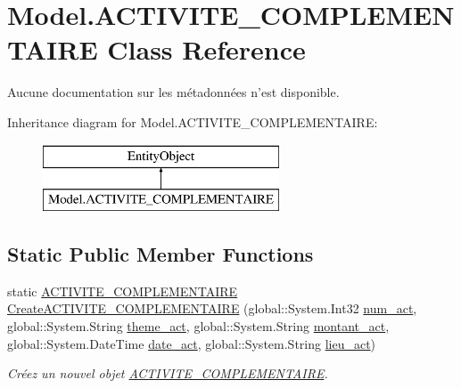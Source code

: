 \hypertarget{class_model_1_1_a_c_t_i_v_i_t_e___c_o_m_p_l_e_m_e_n_t_a_i_r_e}{\section{Model.\-A\-C\-T\-I\-V\-I\-T\-E\-\_\-\-C\-O\-M\-P\-L\-E\-M\-E\-N\-T\-A\-I\-R\-E Class Reference}
\label{class_model_1_1_a_c_t_i_v_i_t_e___c_o_m_p_l_e_m_e_n_t_a_i_r_e}
}


Aucune documentation sur les métadonnées n'est disponible.  


Inheritance diagram for Model.\-A\-C\-T\-I\-V\-I\-T\-E\-\_\-\-C\-O\-M\-P\-L\-E\-M\-E\-N\-T\-A\-I\-R\-E\-:\begin{figure}[H]
\begin{center}
\leavevmode
\includegraphics[height=2.000000cm]{class_model_1_1_a_c_t_i_v_i_t_e___c_o_m_p_l_e_m_e_n_t_a_i_r_e}
\end{center}
\end{figure}
\subsection*{Static Public Member Functions}
\begin{DoxyCompactItemize}
\item 
static \hyperlink{class_model_1_1_a_c_t_i_v_i_t_e___c_o_m_p_l_e_m_e_n_t_a_i_r_e}{A\-C\-T\-I\-V\-I\-T\-E\-\_\-\-C\-O\-M\-P\-L\-E\-M\-E\-N\-T\-A\-I\-R\-E} \hyperlink{class_model_1_1_a_c_t_i_v_i_t_e___c_o_m_p_l_e_m_e_n_t_a_i_r_e_a24ea0e9c3b1ed384f688ff056f124063}{Create\-A\-C\-T\-I\-V\-I\-T\-E\-\_\-\-C\-O\-M\-P\-L\-E\-M\-E\-N\-T\-A\-I\-R\-E} (global\-::\-System.\-Int32 \hyperlink{class_model_1_1_a_c_t_i_v_i_t_e___c_o_m_p_l_e_m_e_n_t_a_i_r_e_a52209b9d343c9c1f6a0d6fd06ee11caf}{num\-\_\-act}, global\-::\-System.\-String \hyperlink{class_model_1_1_a_c_t_i_v_i_t_e___c_o_m_p_l_e_m_e_n_t_a_i_r_e_ac31dc74da88e2bba3a7878e0de1da922}{theme\-\_\-act}, global\-::\-System.\-String \hyperlink{class_model_1_1_a_c_t_i_v_i_t_e___c_o_m_p_l_e_m_e_n_t_a_i_r_e_acc59469c7bb41fc47d357b1352b6e9bc}{montant\-\_\-act}, global\-::\-System.\-Date\-Time \hyperlink{class_model_1_1_a_c_t_i_v_i_t_e___c_o_m_p_l_e_m_e_n_t_a_i_r_e_aacbeaa9cd3bfc61485c1ee7164d7a424}{date\-\_\-act}, global\-::\-System.\-String \hyperlink{class_model_1_1_a_c_t_i_v_i_t_e___c_o_m_p_l_e_m_e_n_t_a_i_r_e_a730e1eac8f9fafbb0f48672688609f5e}{lieu\-\_\-act})
\begin{DoxyCompactList}\small\item\em Créez un nouvel objet \hyperlink{class_model_1_1_a_c_t_i_v_i_t_e___c_o_m_p_l_e_m_e_n_t_a_i_r_e}{A\-C\-T\-I\-V\-I\-T\-E\-\_\-\-C\-O\-M\-P\-L\-E\-M\-E\-N\-T\-A\-I\-R\-E}. \end{DoxyCompactList}\end{DoxyCompactItemize}
